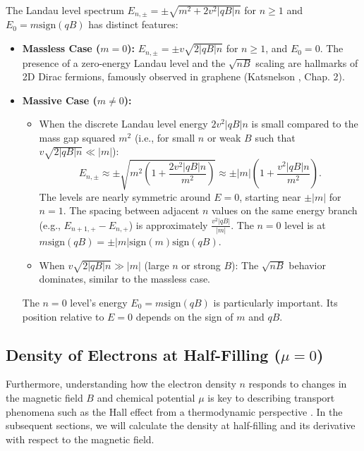 \documentclass[11pt]{article}
\newcommand{\sgn}{\mathrm{sign}}
\begin{document}
The Landau level spectrum $E_{n, \pm} = \pm \sqrt{m^2 + 2 v^2 |qB| n}$ for $n \ge 1$ and $E_0 = m \sgn(qB)$ has distinct features:
\begin{itemize}
    \item \textbf{Massless Case ($m=0$):} $E_{n, \pm} = \pm v \sqrt{2|qB|n}$ for $n \ge 1$, and $E_0 = 0$. The presence of a zero-energy Landau level and the $\sqrt{nB}$ scaling are hallmarks of 2D Dirac fermions, famously observed in graphene (Katsnelson \cite{Katsnelson2012Graphene}, Chap. 2).
        \item \textbf{Massive Case ($m \neq 0$):}
            \begin{itemize}
                \item When the discrete Landau level energy $2 v^2 |qB| n$ is small compared to the mass gap squared $m^2$ (i.e., for small $n$ or weak $B$ such that $v\sqrt{2|qB|n} \ll |m|$):
                $$E_{n, \pm} \approx \pm \sqrt{m^2(1 + \frac{2 v^2 |qB| n}{m^2})} \approx \pm |m| (1 + \frac{v^2 |qB| n}{m^2}).$$
                The levels are nearly symmetric around $E=0$, starting near $\pm|m|$ for $n=1$. The spacing between adjacent $n$ values on the same energy branch (e.g., $E_{n+1,+} - E_{n,+}$) is approximately $\frac{v^2|qB|}{|m|}$.
                The $n=0$ level is at $m \sgn(qB) = \pm |m| \sgn(m)\sgn(qB)$.
                \item When $v\sqrt{2|qB|n} \gg |m|$ (large $n$ or strong $B$): The $\sqrt{nB}$ behavior dominates, similar to the massless case.
            \end{itemize}
        The $n=0$ level's energy $E_0 = m \sgn(qB)$ is particularly important. Its position relative to $E=0$ depends on the sign of $m$ and $qB$.
    \end{itemize}
    

\subsection{Density of Electrons at Half-Filling (\texorpdfstring{$\mu=0$}{mu=0})}

Furthermore, understanding how the electron density $n$ responds to changes in the magnetic field $B$ and chemical potential $\mu$ is key to describing transport phenomena such as the Hall effect from a thermodynamic perspective \cite{Widom1982}. In the subsequent sections, we will calculate the density at half-filling and its derivative with respect to the magnetic field.
\end{document}
